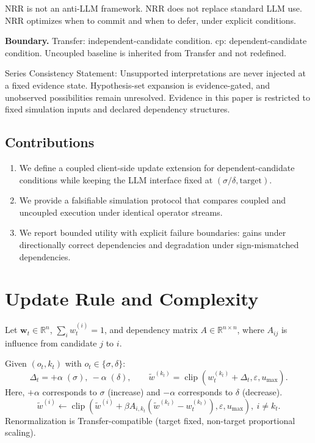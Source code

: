 \documentclass[11pt,a4paper]{article}
\begin{document}
NRR is not an anti-LLM framework.
NRR does not replace standard LLM use.
NRR optimizes when to commit and when to defer, under explicit conditions.

\textbf{Boundary.}
Transfer: independent-candidate condition.
cp: dependent-candidate condition.
Uncoupled baseline is inherited from Transfer and not redefined.

Series Consistency Statement: Unsupported interpretations are never injected at a fixed evidence state. Hypothesis-set expansion is evidence-gated, and unobserved possibilities remain unresolved. Evidence in this paper is restricted to fixed simulation inputs and declared dependency structures.

\subsection{Contributions}
\begin{enumerate}
  \item We define a coupled client-side update extension for dependent-candidate conditions while keeping the LLM interface fixed at \((\sigma/\delta,\text{target})\).
  \item We provide a falsifiable simulation protocol that compares coupled and uncoupled execution under identical operator streams.
  \item We report bounded utility with explicit failure boundaries: gains under directionally correct dependencies and degradation under sign-mismatched dependencies.
\end{enumerate}

\section{Update Rule and Complexity}
Let \(\mathbf{w}_t\in\mathbb{R}^n\), \(\sum_i w_t^{(i)}=1\), and dependency matrix \(A\in\mathbb{R}^{n\times n}\), where \(A_{ij}\) is influence from candidate \(j\) to \(i\).

Given \((o_t,k_t)\) with \(o_t\in\{\sigma,\delta\}\):
\[
\Delta_t = +\alpha\;(\sigma),\ -\alpha\;(\delta),\qquad
\tilde{w}^{(k_t)}=\operatorname{clip}(w_t^{(k_t)}+\Delta_t,\varepsilon,u_{\max}).
\]
Here, \(+\alpha\) corresponds to \(\sigma\) (increase) and \(-\alpha\) corresponds to \(\delta\) (decrease).
\[
\tilde{w}^{(i)} \leftarrow \operatorname{clip}(\tilde{w}^{(i)}+\beta A_{i,k_t}(\tilde{w}^{(k_t)}-w_t^{(k_t)}),\varepsilon,u_{\max}),\ i\neq k_t.
\]
Renormalization is Transfer-compatible (target fixed, non-target proportional scaling).
\end{document}
